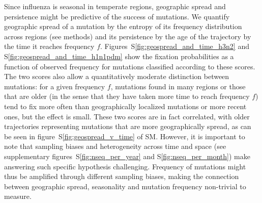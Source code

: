 \documentclass[reprint,amsmath,amssymb,superscriptaddress,showpacs,rmp]{revtex4-1}
\newcommand{\sref}[1]{S\ref{#1}}
\begin{document}
Since influenza is seasonal in temperate regions, geographic spread and persistence might be predictive of the success of mutations.
We quantify geographic spread of a mutation by the entropy of its frequency distribution across regions (see methods) and its persistence by the age of the trajectory by the time it reaches frequency $f$.
Figures~\sref{fig:geospread_and_time_h3n2} and \sref{fig:geospread_and_time_h1n1pdm} show the fixation probabilities as a function of observed frequency for mutations classified according to these scores.
The two scores also allow a quantitatively moderate distinction between mutations: for a given frequency $f$, mutations found in many regions or those that are older (in the sense that they have taken more time to reach frequency $f$) tend to fix more often than geographically localized mutations or more recent ones, but the effect is small.
These two scores are in fact correlated, with older trajectories representing mutations that are more geographically spread, as can be seen in figure~\sref{fig:geospread_v_time} of SM.
However, it is important to note that sampling biases and heterogeneity across time and space (see supplementary figures~\sref{fig:nseq_per_year} and \sref{fig:nseq_per_month}) make answering such specific hypothesis challenging.
Frequency of mutations might thus be amplified through different sampling biases, making the connection between geographic spread, seasonality and mutation frequency non-trivial to measure.
\end{document}
